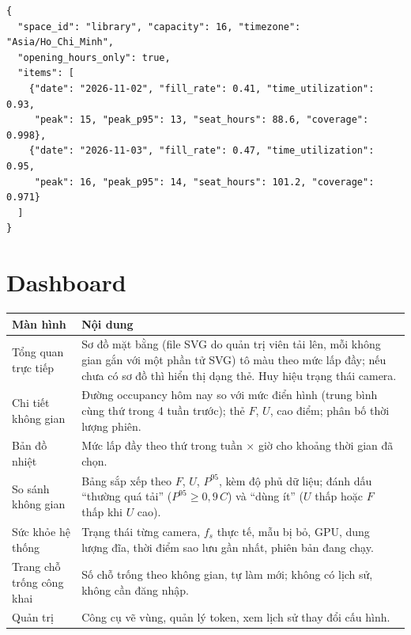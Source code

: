\documentclass[10pt,a4paper,oneside,openany]{report}
\newcommand{\breakus}{\textunderscore\allowbreak}
\newcommand{\code}[1]{{\ttfamily\let\_\breakus #1}}
\newcommand{\tabhead}[1]{\textsf{\bfseries\color{ink}#1}}
\newenvironment{bang}{\par\small\rowcolors{2}{rowgray}{white}}{\par\vspace{0.3em}}
\begin{document}
\begin{lstlisting}[caption={Ví dụ phản hồi \code{GET /api/v1/utilization?space\_id=library\&from=2026-11-02\&to=2026-11-08\&group\_by=day}}]
{
  "space_id": "library", "capacity": 16, "timezone": "Asia/Ho_Chi_Minh",
  "opening_hours_only": true,
  "items": [
    {"date": "2026-11-02", "fill_rate": 0.41, "time_utilization": 0.93,
     "peak": 15, "peak_p95": 13, "seat_hours": 88.6, "coverage": 0.998},
    {"date": "2026-11-03", "fill_rate": 0.47, "time_utilization": 0.95,
     "peak": 16, "peak_p95": 14, "seat_hours": 101.2, "coverage": 0.971}
  ]
}
\end{lstlisting}

\section{Dashboard}\label{sec:dashboard}
\begin{bang}
\begin{tabularx}{\linewidth}{L{34mm}Y}
\toprule
\tabhead{Màn hình} & \tabhead{Nội dung} \\
\midrule
Tổng quan trực tiếp & Sơ đồ mặt bằng (file SVG do quản trị viên tải lên, mỗi không gian gắn với một phần tử SVG) tô màu theo mức lấp đầy; nếu chưa có sơ đồ thì hiển thị dạng thẻ. Huy hiệu trạng thái camera. \\
Chi tiết không gian & Đường occupancy hôm nay so với mức điển hình (trung bình cùng thứ trong 4 tuần trước); thẻ $F$, $U$, cao điểm; phân bố thời lượng phiên. \\
Bản đồ nhiệt & Mức lấp đầy theo thứ trong tuần × giờ cho khoảng thời gian đã chọn. \\
So sánh không gian & Bảng sắp xếp theo $F$, $U$, $P^{95}$, kèm độ phủ dữ liệu; đánh dấu \enquote{thường quá tải} ($P^{95} \ge 0{,}9\,C$) và \enquote{dùng ít} ($U$ thấp hoặc $F$ thấp khi $U$ cao). \\
Sức khỏe hệ thống & Trạng thái từng camera, $f_s$ thực tế, mẫu bị bỏ, GPU, dung lượng đĩa, thời điểm sao lưu gần nhất, phiên bản đang chạy. \\
Trang chỗ trống công khai & Số chỗ trống theo không gian, tự làm mới; không có lịch sử, không cần đăng nhập. \\
Quản trị & Công cụ vẽ vùng, quản lý token, xem lịch sử thay đổi cấu hình. \\
\bottomrule
\end{tabularx}
\end{bang}
\end{document}
